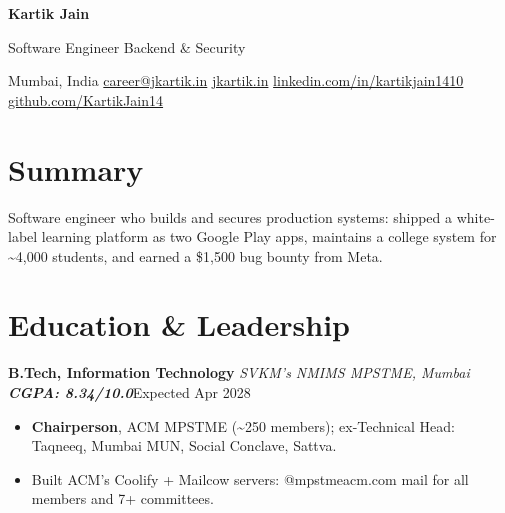 \documentclass[10pt, a4paper]{article}
\newcommand{\role}[3]{\par\vspace{2.5pt}\textbf{#1} \textbar{} \textit{#2}\hfill #3\par}
\newcommand{\lnk}[2]{\href{#1}{\color{linkc}#2}}
\newcommand{\sep}{\enspace\textbar\enspace}
\begin{document}
\begin{center}
  {\fontsize{22pt}{24pt}\selectfont\bfseries Kartik Jain}\par\vspace{3pt}
  {\normalsize Software Engineer \textbar{} Backend \& Security}\par\vspace{3pt}
  {\small Mumbai, India\sep
  \lnk{mailto:career@jkartik.in}{career@jkartik.in}\sep
  \lnk{https://jkartik.in/}{jkartik.in}\sep
  \lnk{https://linkedin.com/in/kartikjain1410}{linkedin.com/in/kartikjain1410}\sep
  \lnk{https://github.com/KartikJain14}{github.com/KartikJain14}}
\end{center}

\section{Summary}
Software engineer who builds and secures production systems: shipped a white-label learning platform as two Google
Play apps, maintains a college system for \textasciitilde{}4,000 students, and earned a \$1,500 bug bounty from Meta.

\section{Education \& Leadership}
\role{B.Tech, Information Technology}{SVKM's NMIMS MPSTME, Mumbai \textbar{} \textup{\textbf{CGPA: 8.34/10.0}}}{Expected Apr 2028}
\begin{itemize}
  \item \textbf{Chairperson}, ACM MPSTME (\textasciitilde{}250 members); ex-Technical Head: Taqneeq, Mumbai MUN, Social Conclave, Sattva.
  \item Built ACM's Coolify + Mailcow servers: @mpstmeacm.com mail for all members and 7+ committees.
\end{itemize}
\end{document}
